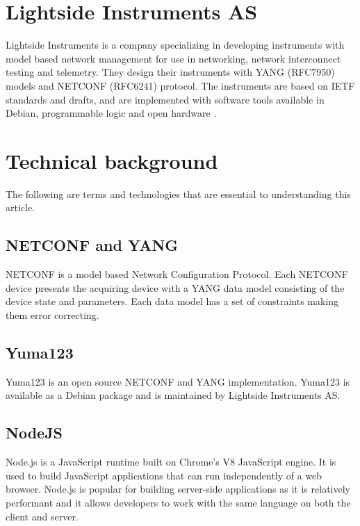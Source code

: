\documentclass[12pt]{article}
\begin{document}
\section{Lightside Instruments AS}
Lightside Instruments is a company specializing in developing instruments with model based network management 
for use in networking, network interconnect testing and telemetry. 
They design their instruments with YANG (RFC7950) \cite{bjorklundYANG11Data2016} models and NETCONF (RFC6241) \cite{ennsNetworkConfigurationProtocol2011} protocol. 
The instruments are based on IETF standards and drafts, 
and are implemented with software tools available in Debian, programmable 
logic and open hardware \cite{LightsideInstrumentsYANG}.

\section{Technical background}
The following are terms and technologies that are essential to understanding this article.

\subsection{NETCONF and YANG}
NETCONF \cite{ennsNetworkConfigurationProtocol2011} is a model based Network Configuration Protocol.
Each NETCONF device presents the acquiring device with a YANG \cite{bjorklundYANG11Data2016} data model
consisting of the device state and parameters. 
Each data model has a set of constraints making them error correcting.

\subsection{Yuma123}
Yuma123 \cite{vassilevVlvassilevYuma1232025} is an open source NETCONF and YANG implementation.
Yuma123 is available as a Debian package and is maintained by Lightside Instruments AS.

\subsection{NodeJS}
Node.js \cite{NodejsRunJavaScript} is a JavaScript runtime built on Chrome's V8 JavaScript engine.
It is used to build JavaScript applications that can run independently of a web browser.
Node.js is popular for building server-side applications as it is relatively performant and 
it allows developers to work with the same language on both the client and server.
\end{document}
